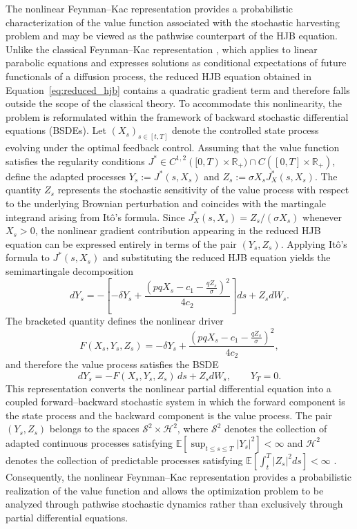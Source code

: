 \documentclass[11pt]{article}
\begin{document}
	The nonlinear Feynman--Kac representation provides a probabilistic characterization of the value function associated with the stochastic harvesting problem and may be viewed as the pathwise counterpart of the HJB equation. Unlike the classical Feynman--Kac representation \citep{kac_1949}, which applies to linear parabolic equations and expresses solutions as conditional expectations of future functionals of a diffusion process, the reduced HJB equation obtained in Equation~\eqref{eq:reduced_hjb} contains a quadratic gradient term and therefore falls outside the scope of the classical theory. To accommodate this nonlinearity, the problem is reformulated within the framework of backward stochastic differential equations (BSDEs). Let $(X_s)_{s\in[t,T]}$ denote the controlled state process evolving under the optimal feedback control. Assuming that the value function satisfies the regularity conditions $J^*\in C^{1,2}([0,T)\times\mathbb{R}_+)\cap C([0,T]\times\mathbb{R}_+)$, define the adapted processes $Y_s:=J^*(s,X_s)$ and $Z_s:=\sigma X_sJ_X^*(s,X_s)$. The quantity $Z_s$ represents the stochastic sensitivity of the value process with respect to the underlying Brownian perturbation and coincides with the martingale integrand arising from It\^o's formula. Since $J_X^*(s,X_s)=Z_s/(\sigma X_s)$ whenever $X_s>0$, the nonlinear gradient contribution appearing in the reduced HJB equation can be expressed entirely in terms of the pair $(Y_s,Z_s)$. Applying It\^o's formula to $J^*(s,X_s)$ and substituting the reduced HJB equation yields the semimartingale decomposition
	\[
	dY_s
	=
	-\left[
	-\delta Y_s
	+
	\frac{
		\left(
		pqX_s-c_1-\frac{qZ_s}{\sigma}
		\right)^2
	}{4c_2}
	\right]ds
	+
	Z_sdW_s.
	\]
	The bracketed quantity defines the nonlinear driver
	\begin{equation}
		F(X_s,Y_s,Z_s)
		=
		-\delta Y_s
		+
		\frac{
			\left(
			pqX_s-c_1-\frac{qZ_s}{\sigma}
			\right)^2
		}{4c_2},
		\label{eq:driver}
	\end{equation}
	and therefore the value process satisfies the BSDE
	\begin{equation}
		dY_s
		=
		-
		F(X_s,Y_s,Z_s)\,ds
		+
		Z_sdW_s,
		\qquad
		Y_T=0.
		\label{eq:bsde}
	\end{equation}
	This representation converts the nonlinear partial differential equation into a coupled forward--backward stochastic system in which the forward component is the state process and the backward component is the value process. The pair $(Y_s,Z_s)$ belongs to the spaces $\mathcal{S}^2\times\mathcal{H}^2$, where $\mathcal{S}^2$ denotes the collection of adapted continuous processes satisfying $\mathbb{E}[\sup_{t\le s\le T}|Y_s|^2]<\infty$ and $\mathcal{H}^2$ denotes the collection of predictable processes satisfying $\mathbb{E}[\int_t^T|Z_s|^2ds]<\infty$ \citep{pramanik20242estimation}. Consequently, the nonlinear Feynman--Kac representation provides a probabilistic realization of the value function and allows the optimization problem to be analyzed through pathwise stochastic dynamics rather than exclusively through partial differential equations.
	
\end{document}
